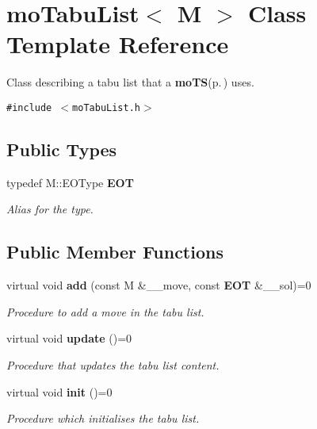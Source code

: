 \section{mo\-Tabu\-List$<$ M $>$ Class Template Reference}
\label{classmo_tabu_list}
Class describing a tabu list that a {\bf mo\-TS}{\rm (p.\,\pageref{classmo_t_s})} uses.  


{\tt \#include $<$mo\-Tabu\-List.h$>$}

\subsection*{Public Types}
\begin{CompactItemize}
\item 
typedef M::EOType {\bf EOT}\label{classmo_tabu_list_e219715cc3fdd5626764bc50ce6357df}

\begin{CompactList}\small\item\em Alias for the type. \item\end{CompactList}\end{CompactItemize}
\subsection*{Public Member Functions}
\begin{CompactItemize}
\item 
virtual void {\bf add} (const M \&\_\-\_\-move, const {\bf EOT} \&\_\-\_\-sol)=0
\begin{CompactList}\small\item\em Procedure to add a move in the tabu list. \item\end{CompactList}\item 
virtual void {\bf update} ()=0
\begin{CompactList}\small\item\em Procedure that updates the tabu list content. \item\end{CompactList}\item 
virtual void {\bf init} ()=0
\begin{CompactList}\small\item\em Procedure which initialises the tabu list. \item\end{CompactList}\end{CompactItemize}



